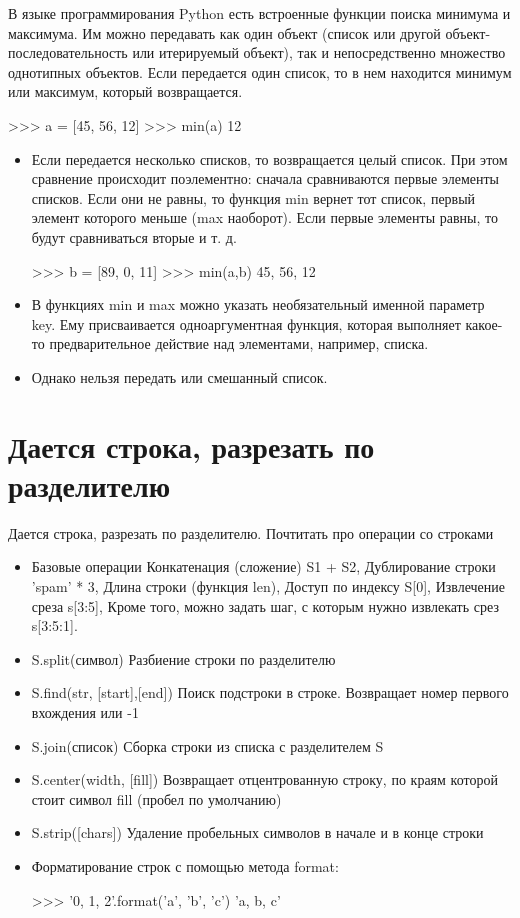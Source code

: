 		В языке программирования Python есть встроенные функции поиска минимума и максимума. Им можно передавать как один объект (список или другой объект-последовательность или итерируемый объект), так и непосредственно множество однотипных объектов. Если передается один список, то в нем находится минимум или максимум, который возвращается.
	\begin{python}
		>>> a = [45, 56, 12] 
		>>> min(a) 
		12 
	\end{python}
	\begin{itemize}
			
		\item Если передается несколько списков, то возвращается целый список. При этом сравнение происходит поэлементно: сначала сравниваются первые элементы списков. Если они не равны, то функция min вернет тот список, первый элемент которого меньше (max наоборот). Если первые элементы равны, то будут сравниваться вторые и т. д.
		\begin{python}
>>> b = [89, 0, 11] 
>>> min(a,b) 
45, 56, 12
		\end{python}
		\item В функциях min и max можно указать необязательный именной параметр key. Ему присваивается одноаргументная функция, которая выполняет какое-то предварительное действие над элементами, например, списка.
		\item Однако нельзя передать или смешанный список.	
	\end{itemize}
		
\section{Дается строка, разрезать по разделителю}

	Дается строка, разрезать по разделителю. Почтитать про операции со строками
	
	\begin{itemize}
	
		\item Базовые операции
		Конкатенация (сложение) S1 + S2, Дублирование строки 'spam' * 3, Длина строки (функция len), Доступ по индексу S[0], Извлечение среза s[3:5], Кроме того, можно задать шаг, с которым нужно извлекать срез s[3:5:1]. 
		\item S.split(символ)	Разбиение строки по разделителю
		\item S.find(str, [start],[end])	Поиск подстроки в строке. Возвращает номер первого вхождения или -1
		\item S.join(список)	Сборка строки из списка с разделителем S
		\item S.center(width, [fill])	Возвращает отцентрованную строку, по краям которой стоит символ fill (пробел по умолчанию)
		\item S.strip([chars])	Удаление пробельных символов в начале и в конце строки
		\item Форматирование строк с помощью метода format:
		\begin{python}
			>>> '{0}, {1}, {2}'.format('a', 'b', 'c')
			'a, b, c'
		\end{python}
	\end{itemize}

